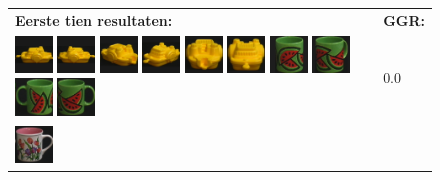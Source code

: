 {\begin{figure}[p]
\vspace{5pt}
\centering
\begin{tabular}{m{11cm} | m{3cm} |}
\textbf{Eerste tien resultaten:} & \textbf{GGR:} \\
\vspace{4pt}
\includegraphics[width=1cm]{coil/beeld-12.eps}
\includegraphics[width=1cm]{coil/beeld-13.eps}
\includegraphics[width=1cm]{coil/beeld-16.eps}
\includegraphics[width=1cm]{coil/beeld-15.eps}
\includegraphics[width=1cm]{coil/beeld-17.eps}
\includegraphics[width=1cm]{coil/beeld-14.eps}
\includegraphics[width=1cm]{coil/beeld-32.eps}
\includegraphics[width=1cm]{coil/beeld-33.eps}
\includegraphics[width=1cm]{coil/beeld-31.eps}
\includegraphics[width=1cm]{coil/beeld-30.eps}
& {\scriptsize 0.0}
\\
\includegraphics[width=1cm]{coil/beeld-6.eps}

\end{tabular}
\end{figure}}

